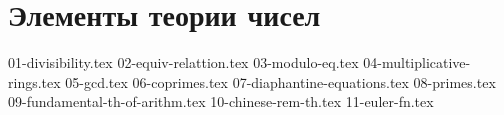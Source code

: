 \section{Элементы теории чисел}
{01-divisibility.tex}
{02-equiv-relattion.tex}
{03-modulo-eq.tex}
{04-multiplicative-rings.tex}
{05-gcd.tex}
{06-coprimes.tex}
{07-diaphantine-equations.tex}
{08-primes.tex}
{09-fundamental-th-of-arithm.tex}
{10-chinese-rem-th.tex}
{11-euler-fn.tex}
